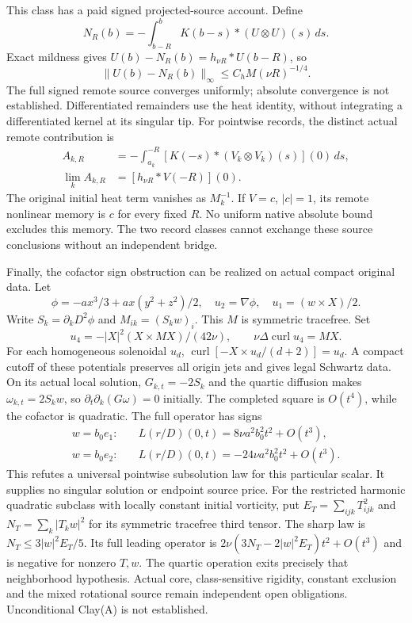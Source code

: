 \documentclass[11pt]{article}
\begin{document}
This class has a paid signed projected-source account. Define
\[
 N_R(b)=-\int_{b-R}^b K(b-s)*(U\otimes U)(s)\,ds.
\]
Exact mildness gives $U(b)-N_R(b)=h_{\nu R}*U(b-R)$, so
\[
 \|U(b)-N_R(b)\|_\infty\le C_hM(\nu R)^{-1/4}.
\]
The full signed remote source converges uniformly; absolute convergence
is not established. Differentiated remainders use the heat identity,
without integrating a differentiated kernel at its singular tip.
For pointwise records, the distinct actual remote contribution is
\[
 \begin{aligned}
 A_{k,R}&=-\int_{a_k}^{-R}[K(-s)*(V_k\otimes V_k)(s)](0)\,ds,\\
 \lim_k A_{k,R}&=[h_{\nu R}*V(-R)](0).
 \end{aligned}
\]
The original initial heat term vanishes as $M_k^{-1}$. If $V=c$, $|c|=1$,
its remote nonlinear memory is $c$ for every fixed $R$. No uniform native
absolute bound excludes this memory. The two record classes cannot exchange
these source conclusions without an independent bridge.

Finally, the cofactor sign obstruction can be realized on actual compact
original data. Let
\[
 \phi=-ax^3/3+ax(y^2+z^2)/2,\quad u_2=\nabla\phi,
 \quad u_1=(w\times X)/2.
\]
Write $S_k=\partial_kD^2\phi$ and $M_{ik}=(S_kw)_i$. This $M$ is symmetric
tracefree. Set
\[
 u_4=-|X|^2(X\times MX)/(42\nu),\qquad
 \nu\Delta\operatorname{curl}u_4=MX.
\]
For each homogeneous solenoidal $u_d$,
$\operatorname{curl}[-X\times u_d/(d+2)]=u_d$.
A compact cutoff of these potentials preserves all origin jets and gives
legal Schwartz data. On its actual local solution, $G_{k,t}=-2S_k$ and
the quartic diffusion makes $\omega_{k,t}=2S_kw$, so
$\partial_t\partial_k(G\omega)=0$ initially. The completed square is
$O(t^4)$, while the cofactor is quadratic. The full operator has signs
\[
 \begin{aligned}
 w=b_0e_1:&\quad L(r/D)(0,t)=8\nu a^2b_0^2t^2+O(t^3),\\
 w=b_0e_2:&\quad L(r/D)(0,t)=-24\nu a^2b_0^2t^2+O(t^3).
 \end{aligned}
\]
This refutes a universal pointwise subsolution law for this particular scalar.
It supplies no singular solution or endpoint source price.
For the restricted harmonic quadratic subclass with locally constant initial
vorticity, put $E_T=\sum_{ijk}T_{ijk}^2$ and
$N_T=\sum_k|T_kw|^2$ for its symmetric tracefree third tensor.
The sharp law is $N_T\le3|w|^2E_T/5$. Its full leading operator is
$2\nu(3N_T-2|w|^2E_T)t^2+O(t^3)$ and is negative for nonzero $T,w$.
The quartic operation exits precisely that neighborhood hypothesis.
Actual core, class-sensitive rigidity, constant exclusion and the mixed
rotational source remain independent open obligations. Unconditional
Clay(A) is not established.
\end{document}
